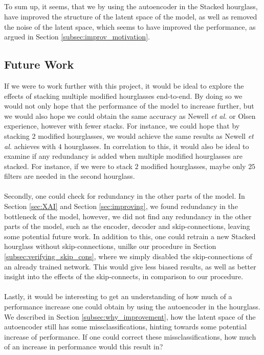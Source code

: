 \documentclass[./main.tex]{subfiles}
\begin{document}
\\
\\
\\
\\
To sum up, it seems, that we by using the autoencoder in the Stacked hourglass, have improved the structure of the latent space of the model, as well as removed the noise of the latent space, which seems to have improved the performance, as argued in Section \ref{subsec:improv_motivation}.

\subsection{Future Work}\label{subsec:Future_work}
If we were to work further with this project, it would be ideal to explore the effects of stacking multiple modified hourglasses end-to-end. By doing so we would not only hope that the performance of the model to increase further, but we would also hope we could obtain the same accuracy as Newell \textit{et al.} \cite{Newell} or Olsen \cite{Camilla} experience, however with fewer stacks. For instance, we could hope that by stacking $2$ modified hourglasses, we would achieve the same results as Newell \textit{et al.}  \cite{Newell} achieves with $4$ hourglasses. In correlation to this, it would also be ideal to examine if any redundancy is added when multiple modified hourglasses are stacked. For instance, if we were to stack $2$ modified hourglasses, maybe only $25$ filters are needed in the second hourglass.
\\
\\
Secondly, one could check for redundancy in the other parts of the model. In Section \ref{sec:XAI} and Section \ref{sec:improving}, we found redundancy in the bottleneck of the model, however, we did not find any redundancy in the other parts of the model, such as the encoder, decoder and skip-connections, leaving some potential future work. In addition to this, one could retrain a new Stacked hourglass without skip-connections, unilke our procedure in Section \ref{subsec:verifying_skip_cons}, where we simply disabled the skip-connections of an already trained network. This would give less biased results, as well as better insight into the effects of the skip-connects, in comparison to our procedure.
\\
\\
Lastly, it would be interesting to get an understanding of how much of a performance increase one could obtain by using the autoencoder in the hourglass. We described in Section \ref{subsec:why_improvement}, how the latent space of the autoencoder still has some missclassifications, hinting towards some potential increase of performance. If one could correct these missclassifications, how much of an increase in performance would this result in?
\end{document}
